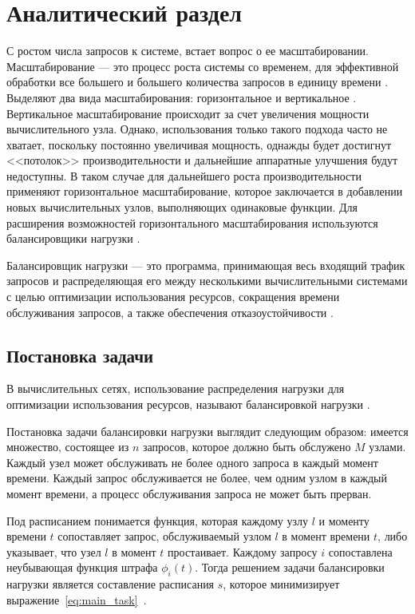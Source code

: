 

\chapter{Аналитический раздел}

С ростом числа запросов к системе, встает вопрос о ее масштабировании. Масштабирование --- это процесс роста системы со временем, для эффективной обработки все большего и большего количества запросов в единицу времени \cite{scaling}. Выделяют два вида масштабирования: горизонтальное и вертикальное \cite{comp, part_algos, com_analysis}. Вертикальное масштабирование происходит за счет увеличения мощности вычислительного узла. Однако, использования только такого подхода часто не хватает, поскольку постоянно увеличивая мощность, однажды будет достигнут <<потолок>> производительности и дальнейшие аппаратные улучшения будут недоступны. В таком случае для дальнейшего роста производительности применяют горизонтальное масштабирование, которое заключается в добавлении новых вычислительных узлов, выполняющих одинаковые функции. Для расширения возможностей горизонтального масштабирования используются балансировщики нагрузки \cite{part_algos, comp}.

Балансировщик нагрузки --- это программа, принимающая весь
входящий трафик запросов и распределяющая его между несколькими
вычислительными системами с целью оптимизации использования
ресурсов, сокращения времени обслуживания запросов, а также
обеспечения отказоустойчивости \cite{comp}.


\section{Постановка задачи}

В вычислительных сетях, использование распределения нагрузки для оптимизации использования ресурсов, называют балансировкой нагрузки \cite{gaud}.

Постановка задачи балансировки нагрузки выглядит следующим образом: имеется множество, состоящее из $n$ запросов, которое должно быть обслужено $M$ узлами. 
Каждый узел может обслуживать не более одного запроса в каждый момент времени. Каждый запрос обслуживается не более, чем одним узлом в каждый момент времени, а процесс обслуживания запроса не может быть прерван. 

Под расписанием понимается функция, которая каждому узлу $l$ и моменту времени $t$ сопоставляет запрос, обслуживаемый узлом $l$ в момент времени $t$, либо указывает, что узел $l$ в момент $t$ простаивает. Каждому запросу $i$ сопоставлена неубывающая функция штрафа $\phi_i(t)$. Тогда решением задачи балансировки нагрузки является составление расписания $s$, которое минимизирует выражение~\eqref{eq:main_task}~\cite{gaud}.

